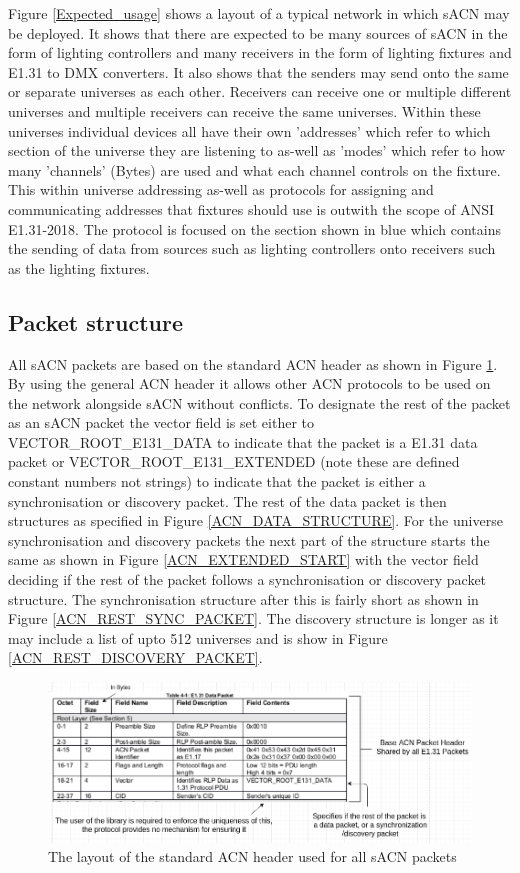 \documentclass[11pt,a4paper]{article}
\begin{document}
Figure \ref{Expected_usage} shows a layout of a typical network in which sACN may be deployed. It shows that there are expected to be many sources of sACN in the form of lighting controllers and many receivers in the form of lighting fixtures and E1.31 to DMX converters. It also shows that the senders may send onto the same or separate universes as each other. Receivers can receive one or multiple different universes and multiple receivers can receive the same universes. Within these universes individual devices all have their own 'addresses' which refer to which section of the universe they are listening to as-well as 'modes' which refer to how many 'channels' (Bytes) are used and what each channel controls on the fixture. This within universe addressing as-well as protocols for assigning and communicating addresses that fixtures should use is outwith the scope of ANSI E1.31-2018. The protocol is focused on the section shown in blue which contains the sending of data from sources such as lighting controllers onto receivers such as the lighting fixtures.\\

\subsection{Packet structure}
All sACN packets are based on the standard ACN header as shown in Figure \ref{ACN_HEADER}. By using the general ACN header it allows other ACN protocols to be used on the network alongside sACN without conflicts. To designate the rest of the packet as an sACN packet the vector field is set either to VECTOR\_ROOT\_E131\_DATA to indicate that the packet is a E1.31 data packet or VECTOR\_ROOT\_E131\_EXTENDED (note these are defined constant numbers not strings) to indicate that the packet is either a synchronisation or discovery packet. The rest of the data packet is then structures as specified in Figure \ref{ACN_DATA_STRUCTURE}. For the universe synchronisation and discovery packets the next part of the structure starts the same as shown in Figure \ref{ACN_EXTENDED_START} with the vector field deciding if the rest of the packet follows a synchronisation or discovery packet structure. The synchronisation structure after this is fairly short as shown in Figure \ref{ACN_REST_SYNC_PACKET}. The discovery structure is longer as it may include a list of upto 512 universes and is show in Figure \ref{ACN_REST_DISCOVERY_PACKET}.

\begin{figure}[H]
\label{ACN_HEADER}
\includegraphics[width=\textwidth]{Acn_header}
\caption{The layout of the standard ACN header used for all sACN packets}
\end{figure}
\end{document}
